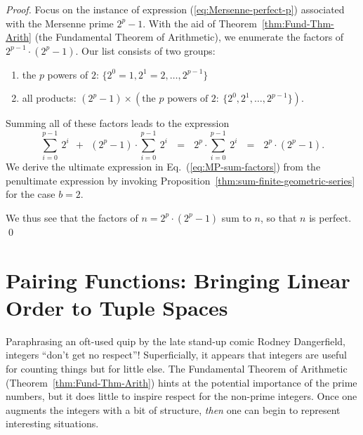 \begin{proof}
Focus on the instance of expression (\ref{eq:Mersenne-perfect-p}) associated with the Mersenne prime $2^p-1$.  With the aid of Theorem~\ref{thm:Fund-Thm-Arith} (the Fundamental Theorem of Arithmetic), we enumerate the factors of $2^{p-1} \cdot (2^p-1)$.  Our list consists of two groups:
\begin{enumerate}
\item
the $p$ powers of $2$:  $\{2^0 =1, 2^1 = 2, \ldots, 2^{p-1}\}$
\medskip\item
all products: $(2^p-1) \times \left( 
\mbox{the $p$ powers of } 2: \ \{ 2^0, 2^1, \ldots, 2^{p-1}\} \right)$.
\end{enumerate}

\smallskip

\noindent
Summing all of these factors leads to the expression
\begin{equation}
\label{eq:MP-sum-factors}
\sum_{i=0}^{p-1} \ 2^i \ \ + \ \ (2^p-1) \cdot \sum_{i=0}^{p-1} \ 2^i
 \ \ \ = \ \ \  2^p \cdot \sum_{i=0}^{p-1} \ 2^i
 \ \ \ = \ \ \ 2^p \cdot (2^p -1).
\end{equation}
We derive the ultimate expression in Eq.~(\ref{eq:MP-sum-factors}) from the penultimate expression by invoking Proposition~\ref{thm:sum-finite-geometric-series} for the case $b=2$.

\smallskip

We thus see that the factors of $n = 2^p \cdot (2^p -1)$ sum to $n$, so that $n$ is perfect.  \qed
\end{proof}


\section{Pairing Functions: Bringing Linear Order to Tuple Spaces}
\label{sec:pairing}

Paraphrasing an oft-used quip by the late stand-up comic Rodney Dangerfield, integers ``don't get no respect''!  Superficially, it appears that integers are useful for counting things but for little else.  The Fundamental Theorem of Arithmetic (Theorem~\ref{thm:Fund-Thm-Arith}) hints at the potential importance of the prime numbers, but it does little to inspire respect for the non-prime integers.  Once one augments the integers with a bit of structure, {\em then} one can begin to represent interesting situations.

